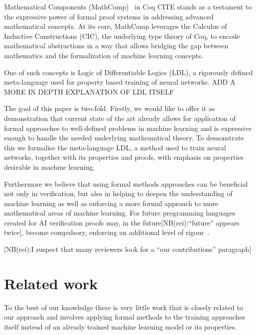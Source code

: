 \documentclass[a4paper,UKenglish,cleveref, autoref, thm-restate]{lipics-v2021}
\def\rei#1{{\color{red}[NB(rei):#1]}}
\begin{document}
Mathematical Components (MathComp)~\cite{mathcomp} in Coq CITE stands as a testament to the expressive power of formal proof systems in addressing advanced mathematical concepts. At its core, MathComp leverages the Calculus of Inductive Constructions (CIC), the underlying type theory of Coq, to encode mathematical abstractions in a way that allows bridging the gap between mathematics and the formalization of machine learning concepts. 

One of such concepts is Logic of Differentiable Logics (LDL), a rigorously defined meta-language used for property based training of neural networks. ADD A MORE IN DEPTH EXPLANATION OF LDL ITSELF

The goal of this paper is two-fold. Firstly, we would like to offer it as demonstration that current state of the art already allows for application of formal approaches to well-defined problems in machine learning and is expressive enough to handle the needed underlying mathematical theory. To demonstrate this we formalise the meta-language LDL, a method used to train neural networks, together with its properties and proofs, with emphasis on properties desirable in machine learning.

Furthermore we believe that using formal methods approaches can be beneficial not only in verification, but also in helping to deepen the understanding of machine learning as well as enforcing a more formal approach to more mathematical areas of machine learning. 
For future programming languages created for AI verification  proofs may, in the future\rei{``future'' appears twice}, become compulsory, enforcing an additional level of rigour~\cite{FoMLAS2023:Vehicle_Tutorial_Neural_Network,seshia2022toward}. 

\rei{I suspect that many reviewers look for a ``our contributions'' paragraph}

\section{Related work}

To the best of our knowledge there is very little work that is closely related to our approach and involves applying formal methods to the training approaches itself instead of an already trained machine learning model or its properties.
\end{document}
